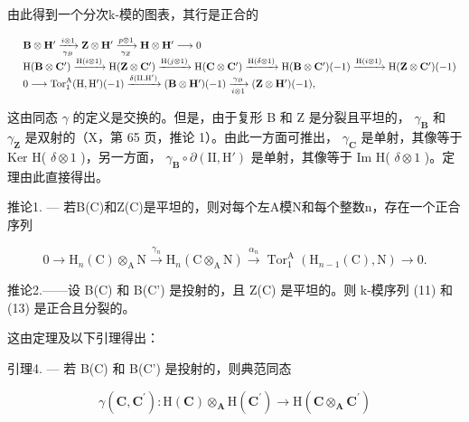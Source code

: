 由此得到一个分次k-模的图表，其行是正合的

\[
\begin{array}{r l} & \mathbf {B} \otimes \mathbf {H} ^ {\prime} \xrightarrow [ \gamma_ {B} ]{i \otimes 1} \mathbf {Z} \otimes \mathbf {H} ^ {\prime} \xrightarrow [ \gamma_ {Z} ]{p \otimes 1} \mathbf {H} \otimes \mathbf {H} ^ {\prime} \longrightarrow 0 \\ & \mathrm{H} (\mathbf {B} \otimes \mathbf {C} ^ {\prime}) \xrightarrow {\mathrm{H} (i \otimes 1)} \mathrm{H} (\mathbf {Z} \otimes \mathbf {C} ^ {\prime}) \xrightarrow {\mathrm{H} (j \otimes 1)} \mathrm{H} (\mathbf {C} \otimes \mathbf {C} ^ {\prime}) \xrightarrow {\mathrm{H} (\delta \otimes 1)} \mathrm{H} (\mathbf {B} \otimes \mathbf {C} ^ {\prime}) (- 1) \xrightarrow {\mathrm{H} (i \otimes 1)} \mathrm{H} (\mathbf {Z} \otimes \mathbf {C} ^ {\prime}) (- 1) \\ & 0 \longrightarrow \operatorname{Tor} _ {1} ^ {\mathrm{A}} (\mathrm{H}, \mathrm{H} ^ {\prime}) (- 1) \xrightarrow {\delta (\mathrm{II.H} ^ {\prime})} (\mathbf {B} \otimes \mathbf {H} ^ {\prime}) (- 1) \xrightarrow [ i \otimes 1 ]{\gamma_ {B}} (\mathbf {Z} \otimes \mathbf {H} ^ {\prime}) (- 1), \end{array}
\]

这由同态 \(\gamma\) 的定义是交换的。但是，由于复形 B 和 Z 是分裂且平坦的， \(\gamma_{\mathbf{B}}\) 和 \(\gamma_{\mathbf{Z}}\) 是双射的（X，第 65 页，推论 1）。由此一方面可推出， \(\gamma_{\mathbf{C}}\) 是单射，其像等于 Ker H( \(\delta \otimes 1\) )，另一方面， \(\gamma_{\mathbf{B}} \circ \partial(\mathrm{II}, \mathrm{H}')\) 是单射，其像等于 Im H( \(\delta \otimes 1\) )。定理由此直接得出。

推论1. --- 若B(C)和Z(C)是平坦的，则对每个左A模N和每个整数n，存在一个正合序列

\[
0 \longrightarrow \mathrm{H} _ {n} (\mathrm{C}) \otimes_ {\mathrm{A}} \mathrm{N} \xrightarrow {\gamma_ {n}} \mathrm{H} _ {n} (\mathrm{C} \otimes_ {\mathrm{A}} \mathrm{N}) \xrightarrow {\alpha_ {n}} \operatorname{Tor} _ {1} ^ {\mathrm{A}} \left(\mathrm{H} _ {n - 1} (\mathrm{C}), \mathrm{N}\right) \longrightarrow 0.\tag{13}
\]

推论2.——设 B(C) 和 B(C') 是投射的，且 Z(C) 是平坦的。则 k-模序列 (11) 和 (13) 是正合且分裂的。

这由定理及以下引理得出：

引理4. --- 若 B(C) 和 B(C') 是投射的，则典范同态

\[
\gamma (\mathbf {C}, \mathbf {C} ^ {\prime}): \mathrm{H} (\mathbf {C}) \otimes_ {\mathbf {A}} \mathrm{H} (\mathbf {C} ^ {\prime}) \rightarrow \mathrm{H} (\mathbf {C} \otimes_ {\mathbf {A}} \mathbf {C} ^ {\prime})
\]

